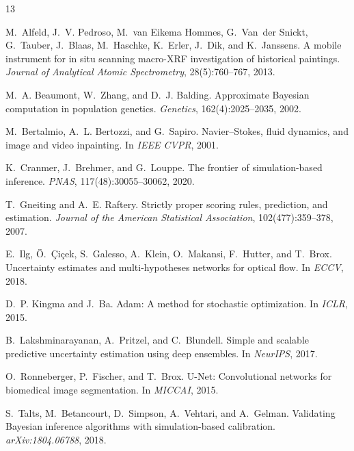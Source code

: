 \documentclass{article}
\begin{document}
\begin{thebibliography}{13}

M.~Alfeld, J.~V. Pedroso, M.~van Eikema Hommes, G.~Van~der Snickt, G.~Tauber, J.~Blaas, M.~Haschke, K.~Erler, J.~Dik, and K.~Janssens.
\newblock A mobile instrument for in situ scanning macro-XRF investigation of historical paintings.
\newblock \emph{Journal of Analytical Atomic Spectrometry}, 28(5):760--767, 2013.

M.~A. Beaumont, W.~Zhang, and D.~J. Balding.
\newblock Approximate Bayesian computation in population genetics.
\newblock \emph{Genetics}, 162(4):2025--2035, 2002.

M.~Bertalmio, A.~L. Bertozzi, and G.~Sapiro.
\newblock Navier--Stokes, fluid dynamics, and image and video inpainting.
\newblock In \emph{IEEE CVPR}, 2001.

K.~Cranmer, J.~Brehmer, and G.~Louppe.
\newblock The frontier of simulation-based inference.
\newblock \emph{PNAS}, 117(48):30055--30062, 2020.

T.~Gneiting and A.~E. Raftery.
\newblock Strictly proper scoring rules, prediction, and estimation.
\newblock \emph{Journal of the American Statistical Association}, 102(477):359--378, 2007.

E.~Ilg, {\"O}.~{\c{C}}i{\c{c}}ek, S.~Galesso, A.~Klein, O.~Makansi, F.~Hutter, and T.~Brox.
\newblock Uncertainty estimates and multi-hypotheses networks for optical flow.
\newblock In \emph{ECCV}, 2018.

D.~P. Kingma and J.~Ba.
\newblock Adam: A method for stochastic optimization.
\newblock In \emph{ICLR}, 2015.

B.~Lakshminarayanan, A.~Pritzel, and C.~Blundell.
\newblock Simple and scalable predictive uncertainty estimation using deep ensembles.
\newblock In \emph{NeurIPS}, 2017.

O.~Ronneberger, P.~Fischer, and T.~Brox.
\newblock U-Net: Convolutional networks for biomedical image segmentation.
\newblock In \emph{MICCAI}, 2015.

S.~Talts, M.~Betancourt, D.~Simpson, A.~Vehtari, and A.~Gelman.
\newblock Validating Bayesian inference algorithms with simulation-based calibration.
\newblock \emph{arXiv:1804.06788}, 2018.


\end{thebibliography}
\end{document}
